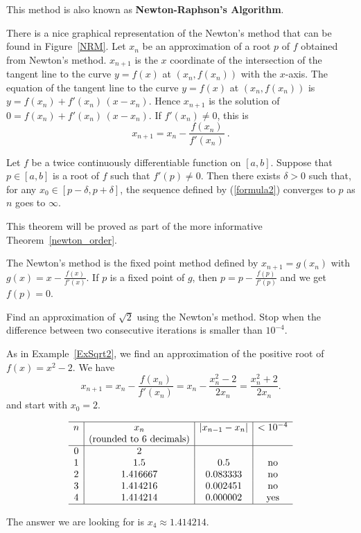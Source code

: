 This method is also known as
{\bfseries Newton-Raphson's Algorithm}.

There is a nice graphical representation of the Newton's method
that can be found in Figure~\ref{NRM}.  Let $x_n$ be an
approximation of a root $p$ of $f$ obtained from Newton's method.
$x_{n+1}$ is the $x$ coordinate of the intersection of the
tangent line to the curve $y=f(x)$ at $(x_n,f(x_n))$ with the
$x$-axis.  The equation of the tangent line to the curve $y=f(x)$ at
$(x_n,f(x_n))$ is $y=f(x_n)+f'(x_n)\,(x-x_n)$.  Hence $x_{n+1}$ is the
solution of $0 = f(x_n)+f'(x_n)\,(x-x_n)$.  If $f'(x_n)\not=0$, this
is
\[
x_{n+1} = x_n-\frac{f(x_n)}{f'(x_n)} \ .
\]


\begin{theorem}
Let $f$ be a twice continuously differentiable function on $[a,b]$.
Suppose that $p \in [a,b]$ is a root of $f$ such that $f'(p) \neq 0$.
Then there exists $\delta > 0$ such that, for any
$x_0 \in [p-\delta, p + \delta]$, the sequence defined by
(\ref{formula2}) converges to $p$ as $n$ goes to $\infty$.
\end{theorem}

This theorem will be proved as part of the more informative
Theorem~\ref{newton_order}.

\begin{rmk} The Newton's method is the fixed point method
defined by $x_{n+1}=g(x_n)$ with
$\displaystyle g(x)=x - \frac{f(x)}{f'(x)}$.  If $p$ is a fixed point
of $g$, then $\displaystyle p = p - \frac{f(p)}{f'(p)}$ and we get
$f(p) = 0$.
\end{rmk}

\begin{egg}
Find an approximation of $\sqrt{2}$ using the Newton's method.
Stop when the difference between two consecutive iterations is smaller
than $10^{-4}$.

As in Example~\ref{ExSqrt2}, we find an approximation of the
positive root of $f(x) = x^2 - 2$.  We have
\[
x_{n+1} = x_n - \frac{f(x_n)}{f'(x_n)}
= x_n - \frac{x_n^2-2}{2 x_n}
= \frac{x_n^2+2}{2 x_n}.
\]
and start with $x_0=2$.

\[
\begin{array}{c|c|c|c}
\hline
n & x_n & |x_{n-1}-x_n| & < 10^{-4} \\
& \text{(rounded to 6 decimals)} & & \\  
\hline
0 & 2 & & \\
1 & 1.5 & 0.5 & \text{no} \\
2 & 1.416667 & 0.083333 & \text{no} \\
3 & 1.414216 & 0.002451 & \text{no} \\
4 & 1.414214 & 0.000002 & \text{yes} \\
\hline
\end{array}
\]

The answer we are looking for is $x_4 \approx 1.414214$.
\end{egg}

